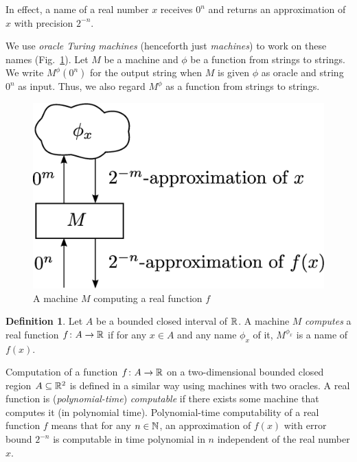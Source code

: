 \documentclass{article}
\theoremstyle{definition}
\newtheorem{definition}[theorem]{Definition}
\theoremstyle{remark}
\begin{document}
In effect, a name of a real number $x$ receives $0 ^n$ and 
returns an approximation of $x$ with precision $2 ^{-n}$.

We use \emph{oracle Turing machines} (henceforth just \emph{machines})
to work on these names (Fig.~\ref{fig:model-of-function}).
Let $M$ be a machine and $\phi$ be a function from strings to strings. 
We write $M ^\phi (0 ^n)$ for the output string 
when $M$ is given
$\phi$ as oracle and string $0^n$ as input.
Thus, we also regard $M^\phi$ as a function from strings to strings.

\begin{figure}
 \begin{center}
  \includegraphics[height=0.17\textheight]{image/model-of-function.eps}
 \end{center}
 \caption{A machine $M$ computing a real function $f$}
 \label{fig:model-of-function}
\end{figure}

\begin{definition}
Let $A$ be a bounded closed interval of\/ $\mathbb R$.
A machine $M$ \emph{computes} a real function $f \colon A \to \mathbb R$ 
if for any $x \in A$ and any name $\phi_x$ of it,
$M^{\phi_x}$ is a name of $f(x)$.
\end{definition}

Computation of a function $f \colon A \to \mathbb R$ on
a two-dimensional bounded closed region $A \subseteq \mathbb R ^2$ 
is defined in a similar way using machines with two oracles.
A real function is (\emph{polynomial-time}) \emph{computable} if there exists some machine that computes it (in polynomial time).
Polynomial-time computability of a real function $f$ means that
for any $n \in \mathbb N$, 
an approximation of $f(x)$ with error bound $2^{-n}$
is computable in time polynomial in $n$ 
independent of the real number $x$.
\end{document}
